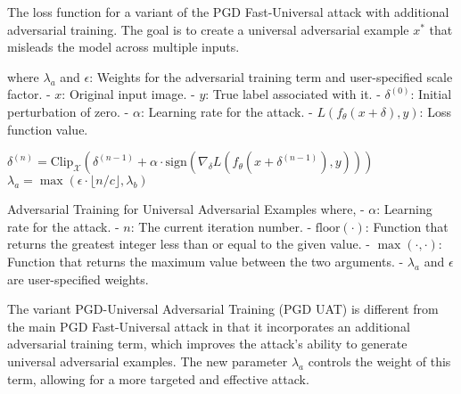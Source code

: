 The loss function for a variant of the PGD Fast-Universal attack with additional adversarial training. The goal is to create a universal adversarial example $x^*$ that misleads the model across multiple inputs.

where $\lambda_a$ and $\epsilon$: Weights for the adversarial training term and user-specified scale factor.
- $x$: Original input image.
- $y$: True label associated with it.
- $\delta^{(0)}$: Initial perturbation of zero.
- $\alpha$: Learning rate for the attack.
- $L(f_\theta(x + \delta), y)$: Loss function value.

$\delta^{(n)} = \text{Clip}_{\mathcal{X}} \left( \delta^{(n-1)} + \alpha \cdot \text{sign} \left( \nabla_\delta L(f_\theta(x + \delta^{(n-1)}), y) \right) \right)$
$\lambda_a = \max(\epsilon \cdot \lfloor n / c \rfloor, \lambda_b)$

Adversarial Training for Universal Adversarial Examples where,
- $\alpha$: Learning rate for the attack.
- $n$: The current iteration number.
- $\text{floor}(\cdot)$: Function that returns the greatest integer less than or equal to the given value.
- $\max(\cdot, \cdot)$: Function that returns the maximum value between the two arguments.
- $\lambda_a$ and $\epsilon$ are user-specified weights.

The variant PGD-Universal Adversarial Training (PGD UAT) is different from the main PGD Fast-Universal attack in that it incorporates an additional adversarial training term, which improves the attack's ability to generate universal adversarial examples. The new parameter $\lambda_a$ controls the weight of this term, allowing for a more targeted and effective attack.